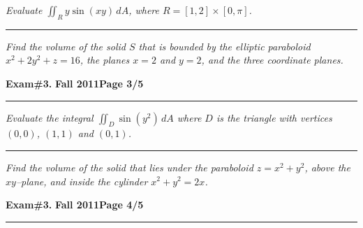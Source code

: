 \documentclass[12pt]{article}
\begin{document}
\bigskip
{\problem[15 pts] \em  Evaluate $\iint_R y \sin(xy)\, dA$, where
  $R=[1,2] \times [0,\pi]$.}
\vspace{8cm}
\begin{flushright}
\end{flushright}
\hrule
{\problem[15 pts] \em Find the volume of the solid $S$ that is bounded
  by the elliptic paraboloid $x^2+2y^2+z=16$, the planes $x=2$ and
  $y=2$, and the three coordinate planes.}
\vspace{9cm}
\begin{flushright}
\end{flushright}
\newpage

\hfill{\large\bf Exam\#3.}\hfill{\large\bf
  Fall 2011}\hfill{\large\bf Page 3/5}\hrule

\bigskip
{\problem[15 pts] \em Evaluate the integral $\iint_D \sin(y^2)\, dA$
  where $D$ is the triangle with vertices $(0,0)$, $(1,1)$ and
  $(0,1)$.}
\vspace{8cm}
\begin{flushright}
\end{flushright}
\hrule
{\problem[10 pts] \em Find the volume of the solid that lies under the
  paraboloid $z=x^2+y^2$, above the $xy$--plane, and inside the
  cylinder $x^2+y^2=2x$.}
\vspace{8cm}
\begin{flushright}
\end{flushright}
\newpage

\hfill{\large\bf Exam\#3.}\hfill{\large\bf
  Fall 2011}\hfill{\large\bf Page 4/5}\hrule
\end{document}
